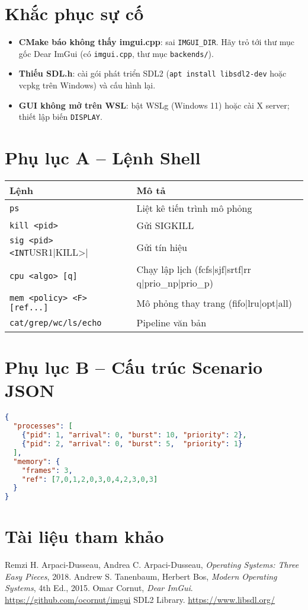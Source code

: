 \documentclass[12pt,a4paper]{report}
\begin{document}
\chapter{Khắc phục sự cố}
\begin{itemize}
  \item \textbf{CMake báo không thấy imgui.cpp}: sai \texttt{IMGUI\_DIR}. Hãy trỏ tới thư mục gốc Dear ImGui (có \texttt{imgui.cpp}, thư mục \texttt{backends/}).
  \item \textbf{Thiếu SDL.h}: cài gói phát triển SDL2 (\texttt{apt install libsdl2-dev} hoặc vcpkg trên Windows) và cấu hình lại.
  \item \textbf{GUI không mở trên WSL}: bật WSLg (Windows 11) hoặc cài X server; thiết lập biến \texttt{DISPLAY}.
\end{itemize}

\chapter{Phụ lục A – Lệnh Shell}
\begin{longtable}{@{}ll@{}}
  \toprule
  Lệnh & Mô tả\\ \midrule
  \verb|ps| & Liệt kê tiến trình mô phỏng\\
  \verb|kill <pid>| & Gửi SIGKILL\\
  \verb|sig <pid> <INT|USR1|KILL>| & Gửi tín hiệu\\
  \verb|cpu <algo> [q]| & Chạy lập lịch (fcfs|sjf|srtf|rr q|prio\_np|prio\_p)\\
  \verb|mem <policy> <F> [ref...]| & Mô phỏng thay trang (fifo|lru|opt|all)\\
  \verb|cat/grep/wc/ls/echo| & Pipeline văn bản\\
  \bottomrule
\end{longtable}

\chapter{Phụ lục B – Cấu trúc Scenario JSON}
\begin{lstlisting}[language=json,caption={Schema tổng quát (ví dụ)}]
{
  "processes": [
    {"pid": 1, "arrival": 0, "burst": 10, "priority": 2},
    {"pid": 2, "arrival": 0, "burst": 5,  "priority": 1}
  ],
  "memory": {
    "frames": 3,
    "ref": [7,0,1,2,0,3,0,4,2,3,0,3]
  }
}
\end{lstlisting}

\chapter*{Tài liệu tham khảo}
\begin{thebibliography}{9}
 Remzi H. Arpaci-Dusseau, Andrea C. Arpaci-Dusseau, \emph{Operating Systems: Three Easy Pieces}, 2018.
 Andrew S. Tanenbaum, Herbert Bos, \emph{Modern Operating Systems}, 4th Ed., 2015.
 Omar Cornut, \emph{Dear ImGui}. \url{https://github.com/ocornut/imgui}
 SDL2 Library. \url{https://www.libsdl.org/}
\end{thebibliography}
\end{document}
